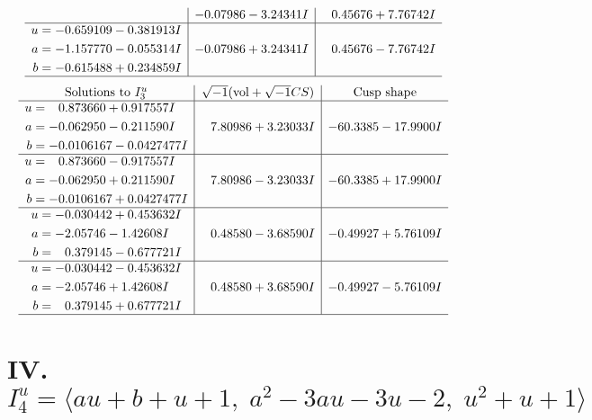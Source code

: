 \documentclass[1p]{elsarticle_modified}
\theoremstyle{definition}
\newcommand{\I}{\sqrt{-1}}
\begin{document}
$$\begin{array}{c|c|c}
 & -0.07986 - 3.24341 I & \phantom{-}0.45676 + 7.76742 I \\ \hline\begin{aligned}
u &= -0.659109 - 0.381913 I \\
a &= -1.157770 - 0.055314 I \\
b &= -0.615488 + 0.234859 I\end{aligned}
 & -0.07986 + 3.24341 I & \phantom{-}0.45676 - 7.76742 I\\
 \hline 
 \end{array}$$\newpage$$\begin{array}{c|c|c}  
\text{Solutions to }I^u_{3}& \I (\text{vol} + \sqrt{-1}CS) & \text{Cusp shape}\\
 \hline 
\begin{aligned}
u &= \phantom{-}0.873660 + 0.917557 I \\
a &= -0.062950 - 0.211590 I \\
b &= -0.0106167 - 0.0427477 I\end{aligned}
 & \phantom{-}7.80986 + 3.23033 I & -60.3385 - 17.9900 I \\ \hline\begin{aligned}
u &= \phantom{-}0.873660 - 0.917557 I \\
a &= -0.062950 + 0.211590 I \\
b &= -0.0106167 + 0.0427477 I\end{aligned}
 & \phantom{-}7.80986 - 3.23033 I & -60.3385 + 17.9900 I \\ \hline\begin{aligned}
u &= -0.030442 + 0.453632 I \\
a &= -2.05746 - 1.42608 I \\
b &= \phantom{-}0.379145 - 0.677721 I\end{aligned}
 & \phantom{-}0.48580 - 3.68590 I & -0.49927 + 5.76109 I \\ \hline\begin{aligned}
u &= -0.030442 - 0.453632 I \\
a &= -2.05746 + 1.42608 I \\
b &= \phantom{-}0.379145 + 0.677721 I\end{aligned}
 & \phantom{-}0.48580 + 3.68590 I & -0.49927 - 5.76109 I\\
 \hline 
 \end{array}$$\newpage\newpage\renewcommand{\arraystretch}{1}
\centering \section*{IV. $I^u_{4}= \langle a u+b+u+1,\;a^2-3 a u-3 u-2,\;u^2+u+1 \rangle$}
\end{document}
